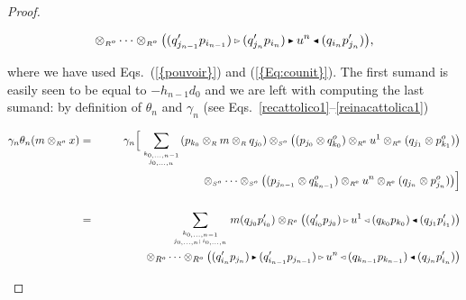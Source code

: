 \documentclass[reqno, a4paper, 10pt]{amsart}
\numberwithin{equation}{section}
\theoremstyle{plain}
\theoremstyle{definition}
\theoremstyle{remark}
\begin{document}
\begin{proof}
\begin{footnotesize}
\begin{equation*}
\begin{split}
\otimes_{{\scriptscriptstyle{{R^{o}}}}}  \cdots \otimes_{{\scriptscriptstyle{{R^{o}}}}} 
\big((q'_{j_{n-1}}p_{i_{n-1}}) {{\,\raise1pt\hbox{$\scriptscriptstyle{\rhd}$} \, }} (q'_{j_n}p_{i_n}) {{\,\raise1pt\hbox{$\scriptscriptstyle{\blacktriangleright}$} \, }} u^n {{\,\raise1pt\hbox{$\scriptscriptstyle{\blacktriangleleft}$} \, }}   (q_{i_n}p'_{j_n}) \big), 
\end{split}
\end{equation*}
\end{footnotesize}
where we have used Eqs.~{{\rm (}\ref{{pouvoir}}{\rm )}} and {{\rm (}\ref{{Eq:counit}}{\rm )}}. 
The first sumand is easily seen to be equal to $- h_{n-1} d_0$ and we are left with computing the last sumand: 
by definition of $\theta_n$ and $\gamma_n$ (see Eqs.~\eqref{recattolico1}--\eqref{reinacattolica1})
\begin{footnotesize}
\begin{eqnarray*}
 \gamma_n\theta_n(m\otimes_{{\scriptscriptstyle{{R^{o}}}}} x) &=& \gamma_n\Big[
\sum_{\scriptscriptstyle{k_{0, \ldots, {n-1}}} \atop \scriptscriptstyle{j_{0, \ldots, n}}} 
  (p_{k_0} \otimes_{{\scriptscriptstyle{R}}} m \otimes_{{\scriptscriptstyle{R}}} q_{j_0}) \otimes_{{\scriptscriptstyle{{S^{o}}}}} \big((p_{j_0} \otimes q_{k_0}^o) \otimes_{{\scriptscriptstyle{{R^{\rm e}}}}} u^1 \otimes_{{\scriptscriptstyle{{R^{\rm e}}}}} (q_{j_1} \otimes p_{k_1}^o)\big)  \\
& &  {{\quad\quad\quad}} {{\quad\quad\quad}} 
\otimes_{{\scriptscriptstyle{{S^{o}}}}}  \cdots \otimes_{{\scriptscriptstyle{{S^{o}}}}} 
\big((p_{j_{n-1}} \otimes q_{k_{n-1}}^o) \otimes_{{\scriptscriptstyle{{R^{\rm e}}}}} u^{n} \otimes_{{\scriptscriptstyle{{R^{\rm e}}}}} (q_{j_{n}} \otimes p_{j_{n}}^o)\big)\underset{\underset{}{}}{\underset{}{}} \Big]
\\ &=& 
 \sum_{\scriptscriptstyle{k_{0, \ldots, {n-1}}}  \atop \scriptscriptstyle{j_{0, \ldots, n};\, i_{0,\ldots,n}}} 
    m (q_{j_0}p_{i_0}') \otimes_{{R^{o}}} \big((q_{i_0}'p_{j_0}){{\,\raise1pt\hbox{$\scriptscriptstyle{\rhd}$} \, }}  u^1 {{\,\raise1pt\hbox{$\scriptscriptstyle{\lhd}$} \, }} (q_{k_0}p_{k_0}) {{\,\raise1pt\hbox{$\scriptscriptstyle{\blacktriangleleft}$} \, }} (q_{j_1}p'_{i_1}) \big) 
\\ 
&& \qquad \qquad \otimes_{{R^{o}}} \cdots \otimes_{{R^{o}}} 
\big((q'_{i_{n}}p_{j_n}){{\,\raise1pt\hbox{$\scriptscriptstyle{\blacktriangleright}$} \, }} (q_{i_{n-1}}'p_{j_{n-1}}) {{\,\raise1pt\hbox{$\scriptscriptstyle{\rhd}$} \, }}  u^{n} {{\,\raise1pt\hbox{$\scriptscriptstyle{\lhd}$} \, }} (q_{k_{n-1}} p_{k_{n-1}}) {{\,\raise1pt\hbox{$\scriptscriptstyle{\blacktriangleleft}$} \, }}(q_{j_{n}} p_{i_{n}}')\big) \\

\end{eqnarray*}
\end{footnotesize}
\end{proof}
\end{document}
